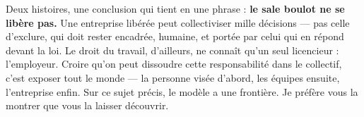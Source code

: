 Deux histoires, une conclusion qui tient en une phrase : \textbf{le sale boulot ne se libère pas.} Une entreprise libérée peut collectiviser mille décisions — pas celle d'exclure, qui doit rester encadrée, humaine, et portée par celui qui en répond devant la loi. Le droit du travail, d'ailleurs, ne connaît qu'un seul licencieur : l'employeur. Croire qu'on peut dissoudre cette responsabilité dans le collectif, c'est exposer tout le monde — la personne visée d'abord, les équipes ensuite, l'entreprise enfin. Sur ce sujet précis, le modèle a une frontière. Je préfère vous la montrer que vous la laisser découvrir.
